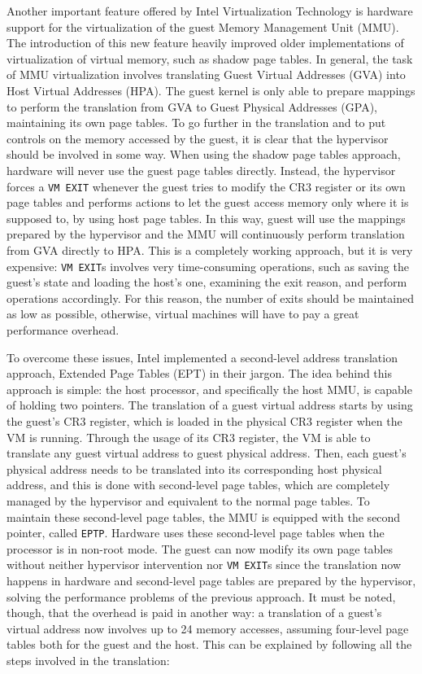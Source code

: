Another important feature offered by Intel Virtualization Technology is hardware support for the virtualization of the guest Memory Management Unit (MMU). The introduction of this new feature heavily improved older implementations of virtualization of virtual memory, such as shadow page tables. In general, the task of MMU virtualization involves translating Guest Virtual Addresses (GVA) into Host Virtual Addresses (HPA). The guest kernel is only able to prepare mappings to perform the translation from GVA to Guest Physical Addresses (GPA), maintaining its own page tables. To go further in the translation and to put controls on the memory accessed by the guest, it is clear that the hypervisor should be involved in some way. When using the shadow page tables approach, hardware will never use the guest page tables directly. Instead, the hypervisor forces a \texttt{VM EXIT} whenever the guest tries to modify the CR3 register or its own page tables and performs actions to let the guest access memory only where it is supposed to, by using host page tables. In this way, guest will use the mappings prepared by the hypervisor and the MMU will continuously perform translation from GVA directly to HPA. This is a completely working approach, but it is very expensive: \texttt{VM EXIT}s involves very time-consuming operations, such as saving the guest's state and loading the host's one, examining the exit reason, and perform operations accordingly. For this reason, the number of exits should be maintained as low as possible, otherwise, virtual machines will have to pay a great performance overhead.
\par 
To overcome these issues, Intel implemented a second-level address translation approach, Extended Page Tables (EPT) in their jargon. The idea behind this approach is simple: the host processor, and specifically the host MMU, is capable of holding two pointers. The translation of a guest virtual address starts by using the guest's CR3 register, which is loaded in the physical CR3 register when the VM is running. Through the usage of its CR3 register, the VM is able to translate any guest virtual address to guest physical address. Then, each guest's physical address needs to be translated into its corresponding host physical address, and this is done with second-level page tables, which are completely managed by the hypervisor and equivalent to the normal page tables. To maintain these second-level page tables, the MMU is equipped with the second pointer, called \texttt{EPTP}. Hardware uses these second-level page tables when the processor is in non-root mode. The guest can now modify its own page tables without neither hypervisor intervention nor \texttt{VM EXIT}s since the translation now happens in hardware and second-level page tables are prepared by the hypervisor, solving the performance problems of the previous approach. It must be noted, though, that the overhead is paid in another way: a translation of a guest's virtual address now involves up to 24 memory accesses, assuming four-level page tables both for the guest and the host. This can be explained by following all the steps involved in the translation:

